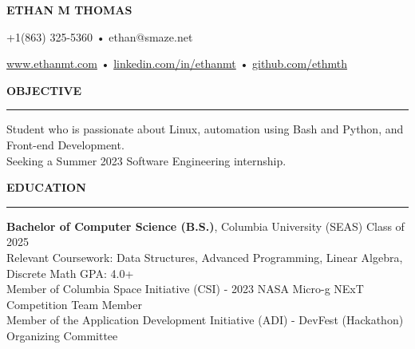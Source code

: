 \documentclass[10pt,letterpaper]{article}
\begin{document}
\begingroup
    \centerline{\MakeUppercase{\LARGE\bf Ethan M Thomas}}
    \medskip
\endgroup

\begingroup
\centerline{+1(863) 325-5360 • ethan@smaze.net}
\endgroup
\par

\begingroup
\centerline{\href{www.ethanmt.com}{www.ethanmt.com} • \href{https://www.linkedin.com/in/ethanmt/}{linkedin.com/in/ethanmt} • \href{https://github.com/ethmth}{github.com/ethmth}}
\endgroup
\par


\medskip
\MakeUppercase{{\bf Objective}} %
\medskip
\hrule %
\begin{list}{}{\setlength{\leftmargin}{0em}}
\item 
    {Student who is passionate about Linux, automation using Bash and Python, and Front-end Development. 
    \\ Seeking a Summer 2023 Software Engineering internship.}
\end{list}


\medskip
\MakeUppercase{{\bf Education}} %
\medskip
\hrule %
\begin{list}{}{\setlength{\leftmargin}{0em}}
\item 
{\bf Bachelor of Computer Science (B.S.)}, Columbia University (SEAS) \hfill  {Class of 2025}\\
Relevant Coursework: Data Structures, Advanced Programming, Linear Algebra, Discrete Math \hfill {GPA: 4.0+}
\medskip
\\
Member of Columbia Space Initiative (CSI) - 2023 NASA Micro-g NExT Competition Team Member \\ 
Member of the Application Development Initiative (ADI) - DevFest (Hackathon) Organizing Committee
\end{list}


\end{document}

